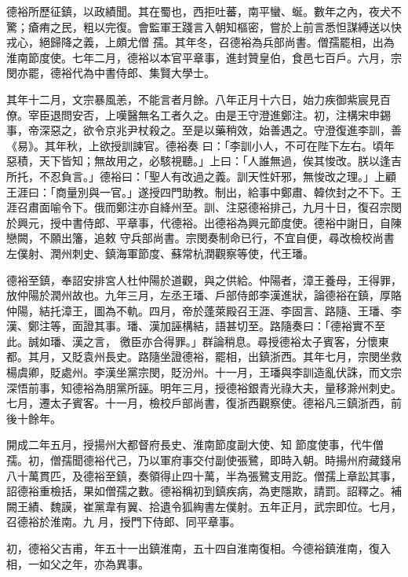 \begin{pinyinscope}
 德裕所歷征鎮，以政績聞。其在蜀也，西拒吐蕃，南平蠻、蜒。數年之內，夜犬不驚；瘡痏之民，粗以完復。會監軍王踐言入朝知樞密，嘗於上前言悉怛謀縛送以快戎心，絕歸降之義，上頗尤僧
 孺。其年冬，召德裕為兵部尚書。僧孺罷相，出為淮南節度使。七年二月，德裕以本官平章事，進封贊皇伯，食邑七百戶。六月，宗閔亦罷，德裕代為中書侍郎、集賢大學士。



 其年十二月，文宗暴風恙，不能言者月餘。八年正月十六日，始力疾御紫宸見百僚。宰臣退問安否，上嘆醫無名工者久之。由是王守澄進鄭注。初，注構宋申錫事，帝深惡之，欲令京兆尹杖殺之。至是以藥稍效，始善遇之。守澄復進李訓，善《易》。其年秋，上欲授訓諫官。德裕奏
 曰：「李訓小人，不可在陛下左右。頃年惡積，天下皆知；無故用之，必駭視聽。」上曰：「人誰無過，俟其悛改。朕以逢吉所托，不忍負言。」德裕曰：「聖人有改過之義。訓天性奸邪，無悛改之理。」上顧王涯曰：「商量別與一官。」遂授四門助教。制出，給事中鄭肅、韓佽封之不下。王涯召肅面喻令下。俄而鄭注亦自絳州至。訓、注惡德裕排己，九月十日，復召宗閔於興元，授中書侍郎、平章事，代德裕。出德裕為興元節度使。德裕中謝日，自陳戀闕，不願出籓，追敕
 守兵部尚書。宗閔奏制命已行，不宜自便，尋改檢校尚書左僕射、潤州刺史、鎮海軍節度、蘇常杭潤觀察等使，代王璠。



 德裕至鎮，奉詔安排宮人杜仲陽於道觀，與之供給。仲陽者，漳王養母，王得罪，放仲陽於潤州故也。九年三月，左丞王璠、戶部侍郎李漢進狀，論德裕在鎮，厚賂仲陽，結托漳王，圖為不軌。四月，帝於蓬萊殿召王涯、李固言、路隨、王璠、李漢、鄭注等，面證其事。璠、漢加誣構結，語甚切至。路隨奏曰：「德裕實不至此。誠如璠、漢之言，
 徼臣亦合得罪。」群論稍息。尋授德裕太子賓客，分懷東都。其月，又貶袁州長史。路隨坐證德裕，罷相，出鎮浙西。其年七月，宗閔坐救楊虞卿，貶處州。李漢坐黨宗閔，貶汾州。十一月，王璠與李訓造亂伏誅，而文宗深悟前事，知德裕為朋黨所誣。明年三月，授德裕銀青光祿大夫，量移滁州刺史。七月，遷太子賓客。十一月，檢校戶部尚書，復浙西觀察使。德裕凡三鎮浙西，前後十餘年。



 開成二年五月，授揚州大都督府長史、淮南節度副大使、知
 節度使事，代牛僧孺。初，僧孺聞德裕代己，乃以軍府事交付副使張鷺，即時入朝。時揚州府藏錢帛八十萬貫匹，及德裕至鎮，奏領得止四十萬，半為張鷺支用訖。僧孺上章訟其事，詔德裕重檢括，果如僧孺之數。德裕稱初到鎮疾病，為吏隱欺，請罰。詔釋之。補闕王績、魏謨，崔黨韋有翼、拾遺令狐綯書左僕射。五年正月，武宗即位。七月，召德裕於淮南。九
 月，授門下侍郎、同平章事。



 初，德裕父吉甫，年五十一出鎮淮南，五十四自淮南復相。今德裕鎮淮南，復入相，一如父之年，亦為異事。




\end{pinyinscope}
